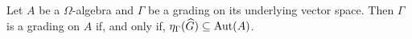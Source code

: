 








\begin{prop}
    Let $A$ be a $\Omega$-algebra and $\Gamma$ be a grading on its underlying vector space. 
    Then $\Gamma$ is a grading on $A$ if, and only if, $\eta_\Gamma(\widehat G) \subseteq \operatorname{Aut}(A)$.
\end{prop}

